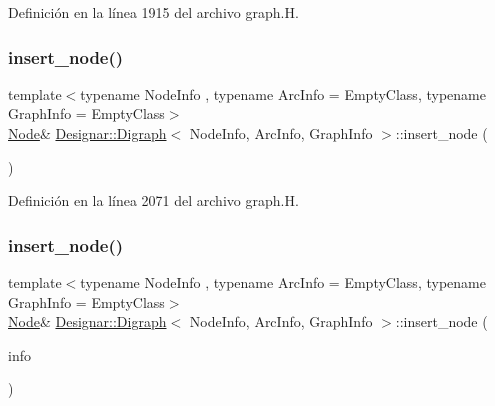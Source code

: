 Definición en la línea 1915 del archivo graph.\+H.

\mbox{\label{class_designar_1_1_digraph_a6ee69792c537ce241a2e448da1b46f1b}} 
\subsubsection{\texorpdfstring{insert\+\_\+node()}{insert\_node()}\hspace{0.1cm}{\footnotesize\ttfamily [2/4]}}
{\footnotesize\ttfamily template$<$typename Node\+Info , typename Arc\+Info  = Empty\+Class, typename Graph\+Info  = Empty\+Class$>$ \\
\hyperlink{class_designar_1_1_digraph_a4dc921c41a480b7946a04170e997d8ae}{Node}\& \hyperlink{class_designar_1_1_digraph}{Designar\+::\+Digraph}$<$ Node\+Info, Arc\+Info, Graph\+Info $>$\+::insert\+\_\+node (\begin{DoxyParamCaption}{ }\end{DoxyParamCaption})\hspace{0.3cm}{\ttfamily [inline]}}



Definición en la línea 2071 del archivo graph.\+H.

\mbox{\label{class_designar_1_1_digraph_a292dae36c1ee1fa581013c908ecebd1c}} 
\subsubsection{\texorpdfstring{insert\+\_\+node()}{insert\_node()}\hspace{0.1cm}{\footnotesize\ttfamily [3/4]}}
{\footnotesize\ttfamily template$<$typename Node\+Info , typename Arc\+Info  = Empty\+Class, typename Graph\+Info  = Empty\+Class$>$ \\
\hyperlink{class_designar_1_1_digraph_a4dc921c41a480b7946a04170e997d8ae}{Node}\& \hyperlink{class_designar_1_1_digraph}{Designar\+::\+Digraph}$<$ Node\+Info, Arc\+Info, Graph\+Info $>$\+::insert\+\_\+node (\begin{DoxyParamCaption}\item[{const Node\+Info \&}]{info }\end{DoxyParamCaption})\hspace{0.3cm}{\ttfamily [inline]}}



